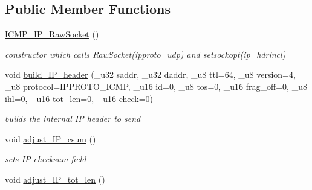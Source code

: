 \subsection*{Public Member Functions}
\begin{CompactItemize}
\item 
\hypertarget{classsocketpp_1_1ICMP__IP__RawSocket_c94fd53fce785a8b9ac5e53c8b1fb694}{
\hyperlink{classsocketpp_1_1ICMP__IP__RawSocket_c94fd53fce785a8b9ac5e53c8b1fb694}{ICMP\_\-IP\_\-RawSocket} ()}
\label{classsocketpp_1_1ICMP__IP__RawSocket_c94fd53fce785a8b9ac5e53c8b1fb694}

\begin{CompactList}\small\item\em constructor which calls RawSocket(ipproto\_\-udp) and setsockopt(ip\_\-hdrincl) \item\end{CompactList}\item 
\hypertarget{classsocketpp_1_1ICMP__IP__RawSocket_08d5813e94daff127499b2d1f7e93324}{
void \hyperlink{classsocketpp_1_1ICMP__IP__RawSocket_08d5813e94daff127499b2d1f7e93324}{build\_\-IP\_\-header} (\_\-u32 saddr, \_\-u32 daddr, \_\-u8 ttl=64, \_\-u8 version=4, \_\-u8 protocol=IPPROTO\_\-ICMP, \_\-u16 id=0, \_\-u8 tos=0, \_\-u16 frag\_\-off=0, \_\-u8 ihl=0, \_\-u16 tot\_\-len=0, \_\-u16 check=0)}
\label{classsocketpp_1_1ICMP__IP__RawSocket_08d5813e94daff127499b2d1f7e93324}

\begin{CompactList}\small\item\em builds the internal IP header to send \item\end{CompactList}\item 
\hypertarget{classsocketpp_1_1ICMP__IP__RawSocket_fa1f786f26097ab8008e7f022b1da2d3}{
void \hyperlink{classsocketpp_1_1ICMP__IP__RawSocket_fa1f786f26097ab8008e7f022b1da2d3}{adjust\_\-IP\_\-csum} ()}
\label{classsocketpp_1_1ICMP__IP__RawSocket_fa1f786f26097ab8008e7f022b1da2d3}

\begin{CompactList}\small\item\em sets IP checksum field \item\end{CompactList}\item 
\hypertarget{classsocketpp_1_1ICMP__IP__RawSocket_f45d8e72973d314a727e3f953dfaaf8e}{
void \hyperlink{classsocketpp_1_1ICMP__IP__RawSocket_f45d8e72973d314a727e3f953dfaaf8e}{adjust\_\-IP\_\-tot\_\-len} ()}
\label{classsocketpp_1_1ICMP__IP__RawSocket_f45d8e72973d314a727e3f953dfaaf8e}


\end{CompactItemize}
